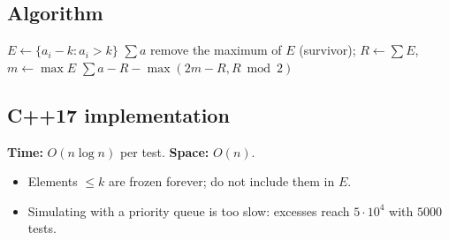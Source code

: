 \subsection*{Algorithm}
\begin{algorithmic}[1]
\State $E\gets\{a_i-k : a_i>k\}$
 \Return $\sum a$ \EndIf
\State remove the maximum of $E$ (survivor); $R\gets\sum E$, $m\gets\max E$
\State \Return $\sum a-R-\max(2m-R,R\bmod2)$
\end{algorithmic}


\subsection*{C++17 implementation}

\begin{complexitybox}
\textbf{Time:} $O(n\log n)$ per test. \textbf{Space:} $O(n)$.
\end{complexitybox}

\begin{pitfallbox}
\begin{itemize}
  \item Elements $\le k$ are frozen forever; do not include them in $E$.
  \item Simulating with a priority queue is too slow: excesses reach
        $5\cdot10^4$ with $5000$ tests.
\end{itemize}
\end{pitfallbox}
